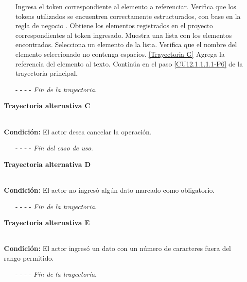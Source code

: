 \begin{enumerate}
	\UCpaso[\UCactor] Ingresa el token correspondiente al elemento a referenciar.
	\UCpaso[\UCsist] Verifica que los tokens utilizados se encuentren correctamente estructurados, con base en la regla de negocio . 
	\UCpaso[\UCsist] Obtiene los elementos registrados en el proyecto correspondientes al token ingresado. 
	\UCpaso[\UCsist] Muestra una lista con los elementos encontrados.
	\UCpaso[\UCactor] Selecciona un elemento de la lista.
	\UCpaso[\UCsist] Verifica que el nombre del elemento seleccionado no contenga espacios. \hyperlink{CU12-1-1-1-1:TAG}{[Trayectoria G]}
	\UCpaso[\UCsist] Agrega la referencia del elemento al texto. \label{CU12.1.1.1.1-TA1}
	\UCpaso Continúa en el paso \ref{CU12.1.1.1.1-P6} de la trayectoria principal.
	\item[- -] - - {\em {Fin de la trayectoria}}.%
\end{enumerate}
\hypertarget{CU12-1-1-1-1:TAC}{\textbf{Trayectoria alternativa C}}\\
\noindent \textbf{Condición:} El actor desea cancelar la operación.
\begin{enumerate}
	\UCpaso[\UCactor] Solicita cancelar la operación oprimiendo el botón  de la pantalla .
	\UCpaso[\UCsist] Muestra la pantalla  o .
	\item[- -] - - {\em {Fin del caso de uso}}.%
\end{enumerate}
\hypertarget{CU12-1-1-1-1:TAD}{\textbf{Trayectoria alternativa D}}\\
\noindent \textbf{Condición:} El actor no ingresó algún dato marcado como obligatorio.
\begin{enumerate}
	\UCpaso[\UCsist] Muestra el mensaje  señalando el campo que presenta el error en la pantalla .
	\UCpaso Regresa al paso \ref{CU12.1.1.1.1-P5} de la trayectoria principal.
	\item[- -] - - {\em {Fin de la trayectoria}}.%
\end{enumerate}
\hypertarget{CU12-1-1-1-1:TAE}{\textbf{Trayectoria alternativa E}}\\
\noindent \textbf{Condición:} El actor ingresó un dato con un número de caracteres fuera del rango permitido.
\begin{enumerate}
	\UCpaso[\UCsist] Muestra el mensaje  señalando el campo que presenta el error en la pantalla .
	\UCpaso Regresa al paso \ref{CU12.1.1.1.1-P5} de la trayectoria principal.
	\item[- -] - - {\em {Fin de la trayectoria}}.%
\end{enumerate}
